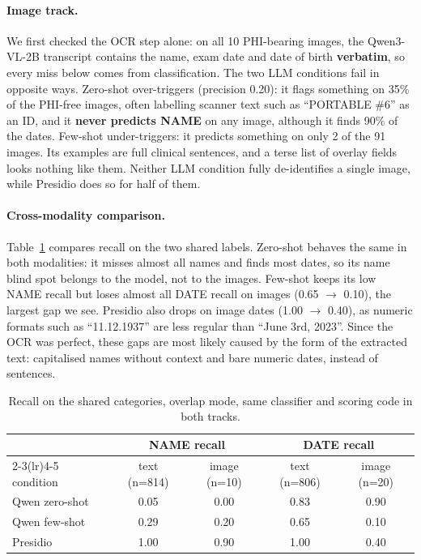 \documentclass[11pt,a4paper]{article}
\begin{document}
\paragraph{Image track.} We first checked the OCR step alone: on all 10 PHI-bearing images, the Qwen3-VL-2B transcript contains the name, exam date and date of birth \textbf{verbatim}, so every miss below comes from classification. The two LLM conditions fail in opposite ways. Zero-shot over-triggers (precision 0.20): it flags something on 35\% of the PHI-free images, often labelling scanner text such as ``PORTABLE \#6'' as an ID, and it \textbf{never predicts NAME} on any image, although it finds 90\% of the dates. Few-shot under-triggers: it predicts something on only 2 of the 91 images. Its examples are full clinical sentences, and a terse list of overlay fields looks nothing like them. Neither LLM condition fully de-identifies a single image, while Presidio does so for half of them.

\paragraph{Cross-modality comparison.} Table~\ref{tab:cross} compares recall on the two shared labels. Zero-shot behaves the same in both modalities: it misses almost all names and finds most dates, so its name blind spot belongs to the model, not to the images. Few-shot keeps its low NAME recall but loses almost all DATE recall on images (0.65 $\rightarrow$ 0.10), the largest gap we see. Presidio also drops on image dates (1.00 $\rightarrow$ 0.40), as numeric formats such as ``11.12.1937'' are less regular than ``June 3rd, 2023''. Since the OCR was perfect, these gaps are most likely caused by the form of the extracted text: capitalised names without context and bare numeric dates, instead of sentences.

\begin{table}[H]
\centering\small
\begin{tabular}{lcccc}
\toprule
 & \multicolumn{2}{c}{NAME recall} & \multicolumn{2}{c}{DATE recall} \\
\cmidrule(lr){2-3}\cmidrule(lr){4-5}
condition & text (n=814) & image (n=10) & text (n=806) & image (n=20) \\
\midrule
Qwen zero-shot & 0.05 & 0.00 & 0.83 & 0.90 \\
Qwen few-shot  & 0.29 & 0.20 & 0.65 & 0.10 \\
Presidio       & 1.00 & 0.90 & 1.00 & 0.40 \\
\bottomrule
\end{tabular}
\caption{Recall on the shared categories, overlap mode, same classifier and scoring code in both tracks.}
\label{tab:cross}
\end{table}
\end{document}
